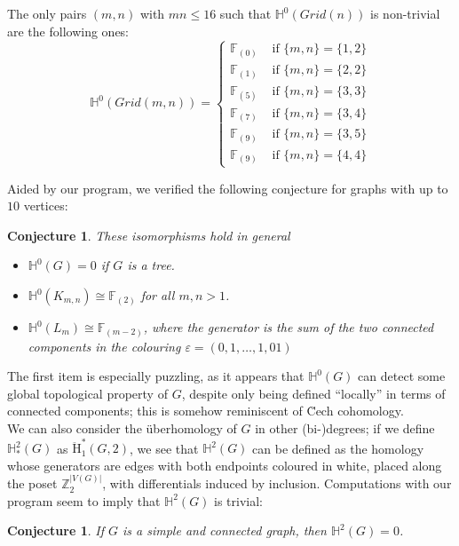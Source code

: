 \documentclass[11pt, a4paper, reqno, twoside, makeidx]{amsart}
\theoremstyle{remark}
\theoremstyle{plain}
\newtheorem{conj}[thm]{Conjecture}
\theoremstyle{definition}
\newcommand{\Z}{\mathbb{Z}}
\newcommand{\F}{\mathbb{F}}
\newcommand{\uH}{\ddot{\mathrm{H}}}
\begin{document}
The only pairs $(m,n)$ with $mn \le 16$ such that $\mathbb{H}^0(Grid(n))$ is non-trivial are the following ones:
\begin{equation*}
\mathbb{H}^0(Grid(m,n)) = \begin{cases}
\F_{(0)} & \text{ if } \{m,n\} = \{1,2\}\\
\F_{(1)} & \text{ if } \{m,n\} = \{2,2\}\\
\F_{(5)} & \text{ if } \{m,n\} = \{3,3\}\\
\F_{(7)} & \text{ if } \{m,n\} = \{3,4\}\\
\F_{(9)} & \text{ if } \{m,n\} = \{3,5\}\\
\F_{(9)} & \text{ if } \{m,n\} = \{4,4\}
\end{cases}
\end{equation*}

Aided by our program, we verified the following conjecture for graphs with up to $10$ vertices:
\begin{conj}\label{conj:0uberforgraphs}
These isomorphisms hold in general
\begin{itemize}
\item $\mathbb{H}^0(G) = 0$ if $G$ is a tree.
\item $\mathbb{H}^0(K_{m,n}) \cong \F_{(2)}$ for all $m,n >1$.
\item $\mathbb{H}^0(L_m) \cong \F_{(m-2)}$, where the generator is the sum of the two connected components in the colouring $\varepsilon = (0, 1, \ldots,1,0 1)$
\end{itemize}
\end{conj}

The first item is especially puzzling, as it appears that $\mathbb{H}^0(G)$ can detect some global topological property of $G$, despite only being defined ``locally'' in terms of connected components; this is somehow reminiscent of \u{C}ech cohomology.
~\\

We can also consider the \"uberhomology of $G$ in other (bi-)degrees; if we define $\mathbb{H}^2_*(G)$ as $\uH^*_1(G,2)$, we see that $\mathbb{H}^2(G)$ can be defined as the homology whose generators are edges with both endpoints coloured in white, placed along the poset $\Z_2^{|V(G)|}$, with differentials induced by inclusion. 
Computations with our program seem to imply that $\mathbb{H}^2(G)$ is trivial:
\begin{conj}
If $G$ is a simple and connected graph, then $\mathbb{H}^2(G) = 0$.
\end{conj}
\end{document}
